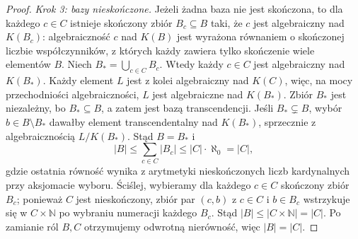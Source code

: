 \begin{proof}
\emph{Krok 3: bazy nieskończone.}
Jeżeli żadna baza nie jest skończona, to dla każdego $c\in C$
istnieje skończony zbiór $B_c\subseteq B$ taki, że
$c$ jest algebraiczny nad $K(B_c)$: algebraiczność $c$
nad $K(B)$ jest wyrażona równaniem o skończonej liczbie
współczynników, z których każdy zawiera tylko skończenie
wiele elementów $B$.
Niech $B_*=\bigcup_{c\in C}B_c$.
Wtedy każdy $c\in C$ jest algebraiczny nad $K(B_*)$.
Każdy element $L$ jest z kolei algebraiczny nad $K(C)$,
więc, na mocy przechodniości algebraiczności,
$L$ jest algebraiczne nad $K(B_*)$.
Zbiór $B_*$ jest niezależny, bo $B_*\subseteq B$,
a zatem jest bazą transcendencji.
Jeśli $B_*\subsetneq B$, wybór $b\in B\setminus B_*$ dawałby
element transcendentalny nad $K(B_*)$, sprzecznie
z algebraicznością $L/K(B_*)$. Stąd $B=B_*$ i
\[
 |B|\le\sum_{c\in C}|B_c|\le |C|\cdot\aleph_0=|C|,
\]
gdzie ostatnia równość wynika z arytmetyki nieskończonych
liczb kardynalnych przy aksjomacie wyboru.
Ściślej, wybieramy dla każdego $c\in C$ skończony zbiór
$B_c$; ponieważ $C$ jest nieskończony, zbiór par
$(c,b)$ z $c\in C$ i $b\in B_c$ wstrzykuje się
w $C\times\mathbb N$ po wybraniu numeracji każdego
$B_c$. Stąd $|B|\le |C\times\mathbb N|=|C|$.
Po zamianie ról $B,C$ otrzymujemy odwrotną nierówność,
więc $|B|=|C|$.
\end{proof}

